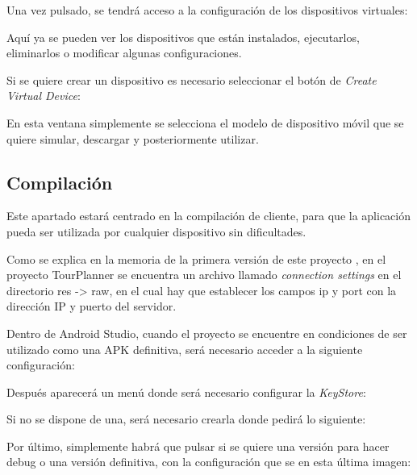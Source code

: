 Una vez pulsado, se tendrá acceso a la configuración de los dispositivos virtuales:


Aquí ya se pueden ver los dispositivos que están instalados, ejecutarlos, eliminarlos o modificar algunas configuraciones.

Si se quiere crear un dispositivo es necesario seleccionar el botón de \textit{Create Virtual Device}:


En esta ventana simplemente se selecciona el modelo de dispositivo móvil que se quiere simular, descargar y posteriormente utilizar.

\subsection{Compilación}

Este apartado estará centrado en la compilación de cliente, para que la aplicación pueda ser utilizada por cualquier dispositivo sin dificultades.

Como se explica en la memoria de la primera versión de este proyecto \cite{tfg1}, en el proyecto TourPlanner se encuentra un archivo llamado \textit{connection settings} en el directorio res -> raw, en el cual hay que establecer los campos ip y port con la dirección IP y puerto del servidor.

Dentro de Android Studio, cuando el proyecto se encuentre en condiciones de ser utilizado como una APK definitiva, será necesario acceder a la siguiente configuración:


Después aparecerá un menú donde será necesario configurar la \textit{KeyStore}:


Si no se dispone de una, será necesario crearla donde pedirá lo siguiente:


Por último, simplemente habrá que pulsar si se quiere una versión para hacer debug o una versión definitiva, con la configuración que se en esta última imagen:


